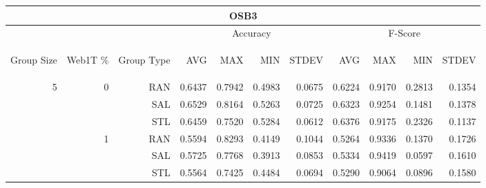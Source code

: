 \begin{center}
\begin{table}[htbp] 
 \begin{center}
\begin{tabular}{ | r | r | r | r | r | r | r | r | r | r | r |}
\hline
\multicolumn{11}{|c|}{OSB3}\\
\hline
 & & & \multicolumn{4}{|c|}{Accuracy} & \multicolumn{4}{|c|}{F-Score}\\ \cline{4-11}
\begin{sideways}Group Size\end{sideways} & \begin{sideways}Web1T \%\end{sideways} & \begin{sideways}Group Type\end{sideways} & \begin{sideways}AVG\end{sideways} & \begin{sideways}MAX\end{sideways} & \begin{sideways}MIN\end{sideways} & \begin{sideways}STDEV\end{sideways} & \begin{sideways}AVG\end{sideways} & \begin{sideways}MAX\end{sideways} & \begin{sideways}MIN\end{sideways} & \begin{sideways}STDEV\end{sideways}\\
\hline
\multirow{18}{*}{5}
 & \multirow{3}{*}{0} & RAN & 0.6437 & 0.7942 & 0.4983 & 0.0675 & 0.6224 & 0.9170 & 0.2813 & 0.1354\\ \cline{3-11}
 &   & SAL & 0.6529 & 0.8164 & 0.5263 & 0.0725 & 0.6323 & 0.9254 & 0.1481 & 0.1378\\ \cline{3-11}
 &   & STL & 0.6459 & 0.7520 & 0.5284 & 0.0612 & 0.6376 & 0.9175 & 0.2326 & 0.1137\\ \cline{2-11}
 & \multirow{3}{*}{1} & RAN & 0.5594 & 0.8293 & 0.4149 & 0.1044 & 0.5264 & 0.9336 & 0.1370 & 0.1726\\ \cline{3-11}
 &   & SAL & 0.5725 & 0.7768 & 0.3913 & 0.0853 & 0.5334 & 0.9419 & 0.0597 & 0.1610\\ \cline{3-11}
 &   & STL & 0.5564 & 0.7425 & 0.4484 & 0.0694 & 0.5290 & 0.9064 & 0.0896 & 0.1580\\ \cline{2-11}

\end{tabular}
\end{center}
\end{table}
\end{center}
